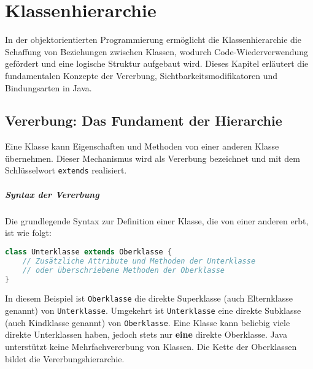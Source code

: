 \chapter{Klassenhierarchie}
\label{chap:klassenhierarchie}

In der objektorientierten Programmierung ermöglicht die Klassenhierarchie die
Schaffung von Beziehungen zwischen Klassen, wodurch Code-Wiederverwendung
gefördert und eine logische Struktur aufgebaut wird. Dieses Kapitel erläutert
die fundamentalen Konzepte der Vererbung, Sichtbarkeitsmodifikatoren und
Bindungsarten in Java.

\section{Vererbung: Das Fundament der Hierarchie}
\label{sec:erben}

Eine Klasse kann Eigenschaften und Methoden von einer anderen Klasse
übernehmen. Dieser Mechanismus wird als Vererbung bezeichnet und mit dem
Schlüsselwort \texttt{extends} realisiert.

\paragraph{Syntax der Vererbung}
Die grundlegende Syntax zur Definition einer Klasse, die von einer anderen
erbt, ist wie folgt:
\begin{lstlisting}[language=Java, caption={Deklaration einer abgeleiteten Klasse}]
class Unterklasse extends Oberklasse {
    // Zusätzliche Attribute und Methoden der Unterklasse
    // oder überschriebene Methoden der Oberklasse
}
\end{lstlisting}
In diesem Beispiel ist \texttt{Oberklasse} die direkte Superklasse (auch
Elternklasse genannt) von \texttt{Unterklasse}. Umgekehrt ist
\texttt{Unterklasse} eine direkte Subklasse (auch Kindklasse genannt) von
\texttt{Oberklasse}. Eine Klasse kann beliebig viele direkte Unterklassen
haben, jedoch stets nur \textbf{eine} direkte Oberklasse. Java unterstützt
keine Mehrfachvererbung von Klassen. Die Kette der Oberklassen bildet die
Vererbungshierarchie.

